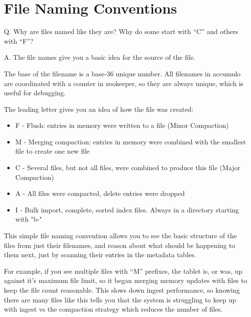 \section{File Naming Conventions}

Q. Why are files named like they are? Why do some start with ``C'' and others with ``F''?

A. The file names give you a basic idea for the source of the file.

The base of the filename is a base-36 unique number. All filenames in accumulo are coordinated 
with a counter in zookeeper, so they are always unique, which is useful for debugging.

The leading letter gives you an idea of how the file was created:

\begin{itemize}
 \item F - Flush: entries in memory were written to a file (Minor Compaction)
 \item M - Merging compaction: entries in memory were combined with the smallest file to create one new file
 \item C - Several files, but not all files, were combined to produce this file (Major Compaction)
 \item A - All files were compacted, delete entries were dropped
 \item I - Bulk import, complete, sorted index files. Always in a directory starting with "b-"
\end{itemize}

This simple file naming convention allows you to see the basic structure of the files from just 
their filenames, and reason about what should be happening to them next, just
by scanning their entries in the metadata tables.

For example, if you see multiple files with ``M'' prefixes, the tablet is, or was, up against it's
maximum file limit, so it began merging memory updates with files to keep the file count reasonable.  This
slows down ingest performance, so knowing there are many files like this tells you that the system
is struggling to keep up with ingest vs the compaction strategy which reduces the number of files.

